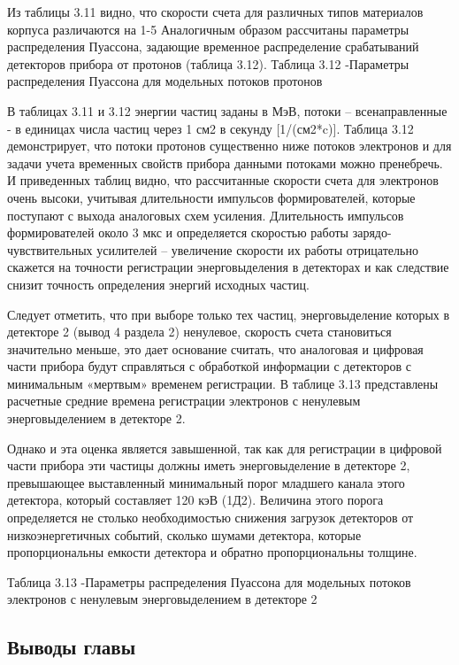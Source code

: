 Из таблицы 3.11 видно, что скорости счета для различных типов материалов корпуса различаются на 1-5%
Аналогичным образом рассчитаны параметры распределения Пуассона, задающие временное распределение срабатываний детекторов прибора от протонов (таблица 3.12).
Таблица 3.12 -Параметры распределения Пуассона для модельных потоков протонов


В таблицах 3.11 и 3.12 энергии частиц заданы в МэВ, потоки – всенаправленные - в единицах числа частиц через 1 см2  в секунду  [1/(см2*c)].  Таблица 3.12 демонстрирует, что потоки протонов существенно ниже потоков электронов и для задачи учета временных свойств прибора данными потоками можно пренебречь.
И приведенных таблиц видно, что рассчитанные скорости счета для электронов очень высоки, учитывая длительности импульсов формирователей, которые поступают с выхода аналоговых схем усиления. Длительность импульсов формирователей около 3 мкс и определяется скоростью работы зарядо-чувствительных усилителей – увеличение скорости их работы отрицательно скажется на точности регистрации энерговыделения в детекторах и как следствие снизит точность определения энергий исходных частиц.

Следует отметить, что при выборе только тех частиц, энерговыделение которых в детекторе 2 (вывод 4 раздела 2) ненулевое, скорость счета становиться значительно меньше, это дает основание считать, что аналоговая и цифровая части прибора будут справляться с обработкой информации с детекторов с минимальным «мертвым» временем регистрации. В таблице 3.13 представлены расчетные средние времена регистрации электронов с ненулевым энерговыделением в детекторе 2. 

Однако и эта оценка является завышенной, так как для регистрации в цифровой части прибора эти частицы должны иметь энерговыделение в детекторе 2, превышающее выставленный минимальный порог младшего канала этого детектора, который составляет 120 кэВ (1Д2). Величина этого порога определяется не столько необходимостью снижения загрузок детекторов от низкоэнергетичных событий, сколько шумами детектора, которые пропорциональны емкости детектора и обратно пропорциональны толщине.


Таблица 3.13 -Параметры распределения Пуассона для модельных потоков электронов с ненулевым энерговыделением в детекторе 2

\subsection{Выводы главы}


